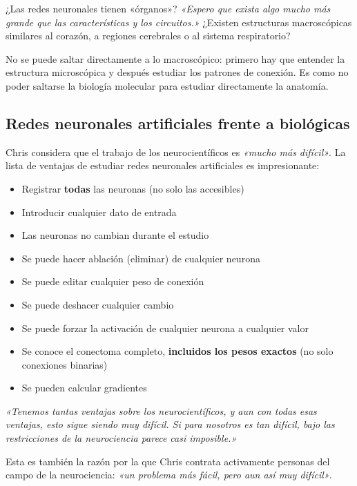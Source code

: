 \documentclass[a4paper]{article}
\begin{document}
\begin{knowledgebox}{¿Las redes neuronales tienen «órganos»?}
\textit{«Espero que exista algo mucho más grande que las características y los circuitos.»} ¿Existen estructuras macroscópicas similares al corazón, a regiones cerebrales o al sistema respiratorio?

No se puede saltar directamente a lo macroscópico: primero hay que entender la estructura microscópica y después estudiar los patrones de conexión. Es como no poder saltarse la biología molecular para estudiar directamente la anatomía.
\end{knowledgebox}

\subsection{Redes neuronales artificiales frente a biológicas}

Chris considera que el trabajo de los neurocientíficos es \textit{«mucho más difícil»}. La lista de ventajas de estudiar redes neuronales artificiales es impresionante:

\begin{itemize}
    \item Registrar \textbf{todas} las neuronas (no solo las accesibles)
    \item Introducir cualquier dato de entrada
    \item Las neuronas no cambian durante el estudio
    \item Se puede hacer ablación (eliminar) de cualquier neurona
    \item Se puede editar cualquier peso de conexión
    \item Se puede deshacer cualquier cambio
    \item Se puede forzar la activación de cualquier neurona a cualquier valor
    \item Se conoce el conectoma completo, \textbf{incluidos los pesos exactos} (no solo conexiones binarias)
    \item Se pueden calcular gradientes
\end{itemize}

\textit{«Tenemos tantas ventajas sobre los neurocientíficos, y aun con todas esas ventajas, esto sigue siendo muy difícil. Si para nosotros es tan difícil, bajo las restricciones de la neurociencia parece casi imposible.»}

Esta es también la razón por la que Chris contrata activamente personas del campo de la neurociencia: \textit{«un problema más fácil, pero aun así muy difícil»}.
\end{document}

